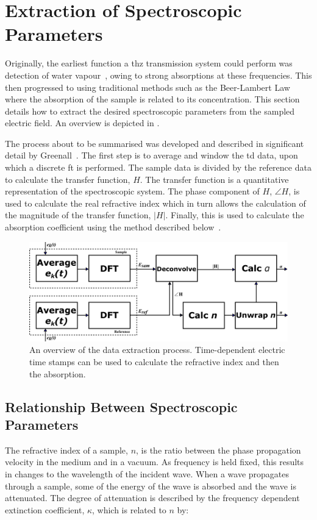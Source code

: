 \section{Extraction of Spectroscopic Parameters}
Originally, the earliest function a \acrshort{thz} transmission system could perform was detection of water vapour~\cite{vanExt1989}, owing to strong absorptions at these frequencies. This then progressed to using traditional methods such as the Beer\nobreakdash-Lambert Law~\cite{Kasap2006} where the absorption of the sample is related to its concentration. This section details how to extract the desired spectroscopic parameters from the sampled electric field. An overview is depicted in . 

The process about to be summarised was developed and described in significant detail by Greenall~\cite{Greenall2017}. The first step is to average and window the \acrshort{td} data, upon which a discrete \acrfull{ft} is performed. The sample data is divided by the reference data to calculate the transfer function, \(H\). The transfer function is a quantitative representation of the spectroscopic system. The phase component of \(H\), \(\angle H\), is used to calculate the real refractive index which in turn allows the calculation of the magnitude of the transfer function, \(|H|\). Finally, this is used to calculate the absorption coefficient using the method described below~\cite{Greenall2017}.

\begin{figure}[b]
    \centering
    \includegraphics{Figures/Misc/Theory/SignalToParamFlow.png}
    \captionsetup{font = footnotesize, justification = centering}
    \caption[An Overview of the Data Extraction Process]{An overview of the data extraction process. Time-dependent electric time stamps can be used to calculate the refractive index and then the absorption.}
    \label{fig:dataextraction}
\end{figure}

\subsection{Relationship Between Spectroscopic Parameters}
The refractive index of a sample, \(n\), is the ratio between the phase propagation velocity in the medium and in a vacuum. As frequency is held fixed, this results in changes to the wavelength of the incident wave. When a wave propagates through a sample, some of the energy of the wave is absorbed and the wave is attenuated. The degree of attenuation is described by the frequency dependent extinction coefficient, \(\kappa\), which is related to \(n\) by:

